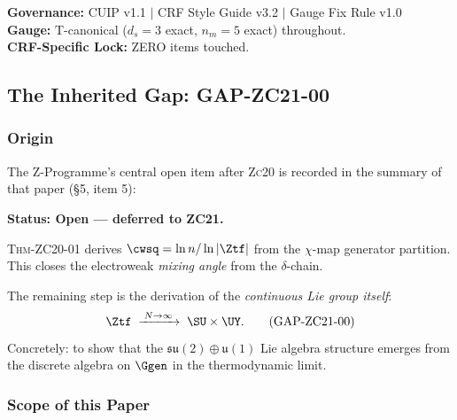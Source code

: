 \documentclass[12pt, a4paper]{article}
\begin{document}
\vspace{0.5em}
\begin{center}
\small\color{mutedgray}
\textbf{Governance:} CUIP v1.1 \quad$|$\quad
CRF Style Guide v3.2 \quad$|$\quad
Gauge Fix Rule v1.0\\[2pt]
\textbf{Gauge:} T-canonical ($d_s = 3$ exact, $n_m = 5$ exact) throughout.\\[2pt]
\textbf{CRF-Specific Lock:} ZERO items touched.
\end{center}

\tableofcontents
\newpage

\subsection{The Inherited Gap: GAP-ZC21-00}
\label{zc21:sec:gap}

\subsubsection{Origin}

The Z-Programme's central open item after \textsc{Zc20} is recorded in the
summary of that paper (§5, item 5):

\begin{openqbox}[title={GAP-ZC21-00 (Inherited from ZC20 COR-ZC20-02)}]
\label{zc21:gap:zc21-00}
\textbf{Status: Open — deferred to ZC21.}

\textsc{Thm-ZC20-01} derives $\cwsq = \ln n / \ln|\Ztf|$ from the
$\chi$-map generator partition.
This closes the electroweak \emph{mixing angle} from the $\delta$-chain.

The remaining step is the derivation of the \emph{continuous Lie group
itself}:
\begin{equation}
  \Ztf \;\xrightarrow{\;N\to\infty\;}\; \SU \times \UY.
  \tag{GAP-ZC21-00}
\end{equation}
Concretely: to show that the $\mathfrak{su}(2)\oplus\mathfrak{u}(1)$
Lie algebra structure emerges from the discrete algebra on $\Ggen$
in the thermodynamic limit.
\end{openqbox}

\subsubsection{Scope of this Paper}
\end{document}
